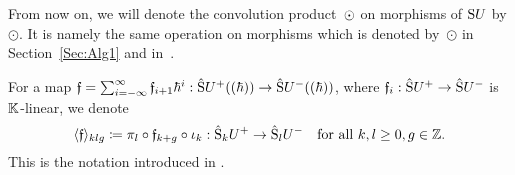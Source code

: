 \documentclass[\MainFolder/Text.tex]{subfiles}
\begin{document}
\begin{Notation}[Replacing $\Star$ with $\odot$ for $V=\Sym U$]
From now on, we will denote the convolution product~$\Star$ on morphisms of $\mathrm{S} U$ by $\odot$. It is namely the same operation on morphisms which is denoted by~$\odot$ in Section~\ref{Sec:Alg1} and in~\cite{Cieliebak2015}.
\end{Notation}
\renewcommand{\Star}{\odot}
For a map $\mathfrak{f} = \sum_{i=-\infty}^\infty \mathfrak{f}_{i+1}\hbar^i: \hat{\mathrm{S}}U^+((\hbar)) \rightarrow \hat{\mathrm{S}}U^-((\hbar))$, where $\mathfrak{f}_{i}: \hat{\mathrm{S}}U^+\rightarrow\hat{\mathrm{S}}U^-$ is $\mathbb{K}$-linear, we denote 
\[ \langle \mathfrak{f}\rangle_{klg} \coloneqq \pi_l \circ \mathfrak{f}_{k+g}\circ \iota_k: \hat{\mathrm{S}}_k U^+ \rightarrow \hat{\mathrm{S}}_l U^-\quad\text{for all }k, l\ge 0, g\in \mathbb{Z}. \]
This is the notation introduced in \cite[Equation~(2.14)]{Cieliebak2015}.
\end{document}
